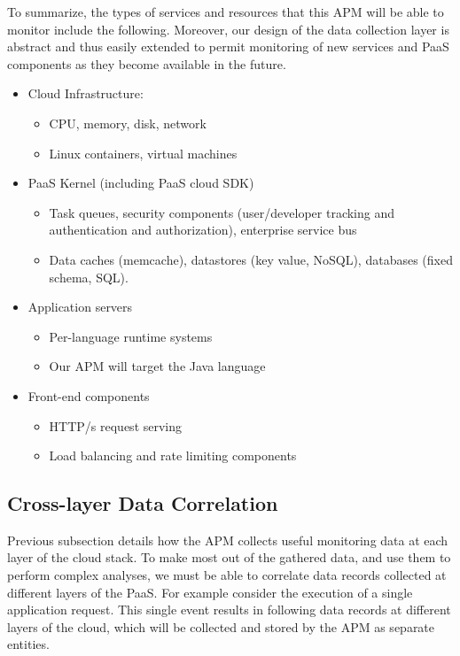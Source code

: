 \documentclass[11pt]{article}
\begin{document}
To summarize, the types of services and resources that this APM will be able
to monitor include the following. Moreover, our design of the data collection layer is abstract and thus easily extended to permit monitoring of new services and PaaS components as they become available in the future.
\begin{itemize}
\item Cloud Infrastructure: 
\begin{itemize}
\item CPU, memory, disk, network
\item Linux containers, virtual machines
\end{itemize}
\item PaaS Kernel (including PaaS cloud SDK)
\begin{itemize}
\item Task queues, security components (user/developer tracking and authentication and authorization), enterprise service bus
\item Data caches (memcache), datastores (key value, NoSQL), databases (fixed schema, SQL).
\end{itemize}
\item Application servers
\begin{itemize}
\item Per-language runtime systems
\item Our APM will target the Java language
\end{itemize}
\item Front-end components
\begin{itemize}
\item HTTP/s request serving 
\item Load balancing and rate limiting components
\end{itemize}
\end{itemize}

\subsection{Cross-layer Data Correlation}
Previous subsection details how the APM collects useful monitoring data at each layer of the cloud
stack. To make most out of the gathered data, and use them to perform complex analyses, we must be able to correlate data records collected at different layers of the PaaS. For example consider
the execution of a single application request. This single event results in following data records at
different layers of the cloud, which will be collected and stored by the APM as separate entities.
\end{document}
